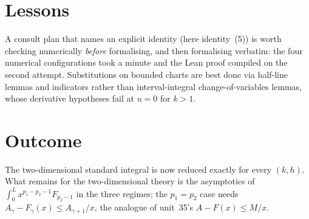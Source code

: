 \documentclass[11pt]{article}
\begin{document}
\section{Lessons}
A consult plan that names an explicit identity (here identity~(5)) is worth checking numerically
\emph{before} formalising, and then formalising verbatim: the four numerical configurations took a
minute and the Lean proof compiled on the second attempt. Substitutions on bounded charts are best
done via half-line lemmas and indicators rather than interval-integral change-of-variables lemmas,
whose derivative hypotheses fail at $u=0$ for $k>1$.

\section{Outcome}
The two-dimensional standard integral is now reduced exactly for every $(k,h)$. What remains for the
two-dimensional theory is the asymptotics of $\int_0^Lx^{p_1-p_2-1}F_{p_2-1}$ in the three regimes;
the $p_1=p_2$ case needs $A_\gamma-F_\gamma(x)\le A_{\gamma+1}/x$, the analogue of unit~35's
$A-F(x)\le M/x$.
\end{document}
